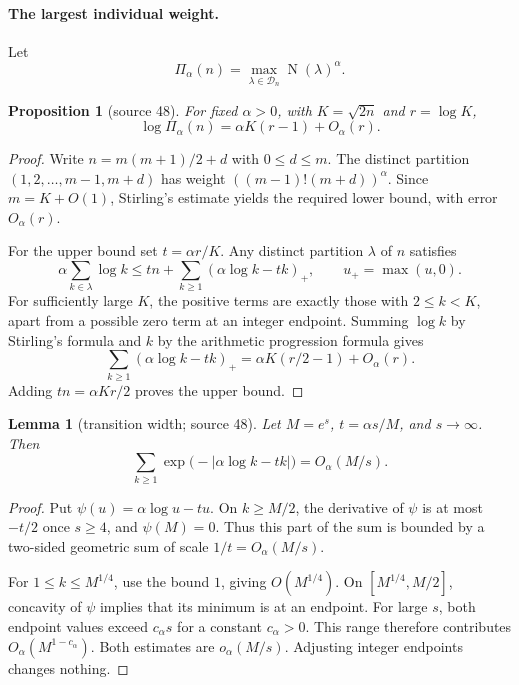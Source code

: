 \documentclass[11pt]{article}
\numberwithin{equation}{section}
\newtheorem{proposition}[theorem]{Proposition}
\newtheorem{lemma}[theorem]{Lemma}
\theoremstyle{definition}\newtheorem{definition}[theorem]{Definition}
\theoremstyle{remark}\newtheorem{remark}[theorem]{Remark}
\newcommand{\normp}{\operatorname{N}}
\begin{document}
\paragraph{The largest individual weight.}
Let
\[
 \Pi_\alpha(n)=\max_{\lambda\in\mathcal D_n}\normp(\lambda)^\alpha .
\]
\begin{proposition}[source 48]\label{dpn:48:prop:maxweight}
For fixed $\alpha>0$, with $K=\sqrt{2n}$ and $r=\log K$,
\begin{equation}\label{dpn:48:eq:maxweight}
 \log\Pi_\alpha(n)=\alpha K(r-1)+O_\alpha(r).
\end{equation}
\end{proposition}
\begin{proof}
Write $n=m(m+1)/2+d$ with $0\le d\le m$. The distinct partition
$(1,2,\ldots,m-1,m+d)$ has weight $((m-1)!(m+d))^\alpha$. Since $m=K+O(1)$,
Stirling's estimate yields the required lower bound, with error $O_\alpha(r)$.

For the upper bound set $t=\alpha r/K$. Any distinct partition $\lambda$ of $n$
satisfies
\[
 \alpha\sum_{k\in\lambda}\log k
 \le tn+\sum_{k\ge1}(\alpha\log k-tk)_+,
 \qquad u_+=\max(u,0).
\]
For sufficiently large $K$, the positive terms are exactly those with
$2\le k<K$, apart from a possible zero term at an integer endpoint. Summing
$\log k$ by Stirling's formula and $k$ by the arithmetic progression formula
gives
\[
 \sum_{k\ge1}(\alpha\log k-tk)_+
       =\alpha K(r/2-1)+O_\alpha(r).
\]
Adding $tn=\alpha Kr/2$ proves the upper bound.
\end{proof}

\begin{lemma}[transition width; source 48]\label{dpn:48:lem:width}
Let $M=e^s$, $t=\alpha s/M$, and $s\to\infty$. Then
\begin{equation}\label{dpn:48:eq:smoothingbound}
 \sum_{k\ge1}\exp\bigl(-|\alpha\log k-tk|\bigr)=O_\alpha(M/s).
\end{equation}
\end{lemma}
\begin{proof}
Put $\psi(u)=\alpha\log u-tu$. On $k\ge M/2$, the derivative of $\psi$ is at
most $-t/2$ once $s\ge4$, and $\psi(M)=0$. Thus this part of the sum is
bounded by a two-sided geometric sum of scale $1/t=O_\alpha(M/s)$.

For $1\le k\le M^{1/4}$, use the bound $1$, giving $O(M^{1/4})$. On
$[M^{1/4},M/2]$, concavity of $\psi$ implies that its minimum is at an
endpoint. For large $s$, both endpoint values exceed $c_\alpha s$ for a
constant $c_\alpha>0$. This range therefore contributes $O_\alpha(M^{1-c_\alpha})$.
Both estimates are $o_\alpha(M/s)$. Adjusting integer endpoints changes
nothing.
\end{proof}
\end{document}
